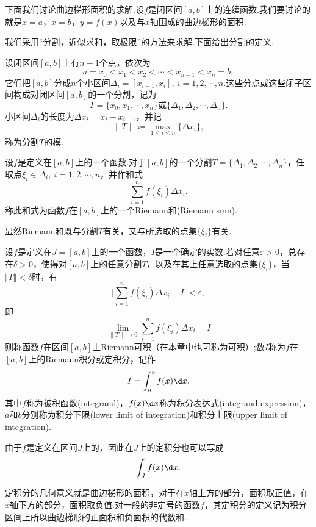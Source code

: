 下面我们讨论曲边梯形面积的求解.设$f$是闭区间$\left[a,b\right]$上的连续函数.我们要讨论的就是$x=a$，$x=b$，$y=f(x)$以及与$x$轴围成的曲边梯形的面积.

我们采用“{\heiti 分割，近似求和，取极限}”的方法来求解.下面给出分割的定义.
\begin{definition}[分割]
	设闭区间$\left[a,b\right]$上有$n-1$个点，依次为
	$$a=x_0<x_1<x_2<\cdots <x_{n-1}<x_n=b,$$
	它们把$\left[a,b\right]$分成$n$个小区间$\Delta_i=\left[x_{i-1},x_i\right],\ i=1,2,\cdots,n$.这些分点或这些闭子区间构成对闭区间$\left[a,b\right]$的一个{\heiti 分割}，记为
	$$T=\{x_0,x_1,\cdots,x_n\}\text{或}\{\Delta_1,\Delta_2,\cdots,\Delta_n\}.$$
	小区间$\Delta_i$的长度为$\Delta x_i=x_i-x_{i-1}$，并记
	$$\| T\|\coloneqq\mathop{\max}_{1\leqslant i\leqslant n}\{\Delta x_i\},$$
	称为分割$T$的{\heiti 模}.
\end{definition}
\begin{definition}[Riemann和]
	设$f$是定义在$\left[a,b\right]$上的一个函数.对于$\left[a,b\right]$的一个分割$T=\{\Delta_1,\Delta_2,\cdots,\Delta_n\}$，任取点$\xi_i\in\Delta_i,\ i=1,2,\cdots,n$，并作和式
	$$\sum_{i=1}^{n}f(\xi_i)\Delta x_i.$$
	称此和式为函数$f$在$\left[a,b\right]$上的一个{\heiti Riemann和}(Riemann sum).
\end{definition}
显然Riemann和既与分割$T$有关，又与所选取的点集$\{\xi_i\}$有关.
\begin{definition}[Riemann积分]
	设$f$是定义在$J=\left[a,b\right]$上的一个函数，$I$是一个确定的实数.若对任意$\varepsilon>0$，总存在$\delta>0$，使得对$\left[a,b\right]$上的{\heiti 任意}分割$T$，以及在其上{\heiti 任意}选取的点集$\{\xi_i\}$，当$\Vert T\Vert<\delta$时，有
	$$\big|\sum_{i=1}^{n}f(\xi_i)\Delta x_i-I\big|<\varepsilon,$$
	即
	$$\lim\limits_{\|T\|\to 0}\sum_{i=1}^{n}f(\xi_i)\Delta x_i=I$$
	则称函数$f$在区间$\left[a,b\right]$上{\heiti Riemann可积}（在本章中也可称为可积）;数$I$称为$f$在$\left[a,b\right]$上的{\heiti Riemann积分}或{\heiti 定积分}，记作
	$$I=\int_{a}^{b}f(x)\d x.$$
	其中$f$称为{\heiti 被积函数}(integrand)，$f(x)\d x$称为{\heiti 积分表达式}(integrand expression)，$a$和$b$分别称为{\heiti 积分下限}(lower limit of integration)和{\heiti 积分上限}(upper limit of integration).
\end{definition}
\begin{remark}
	由于$f$是定义在区间$J$上的，因此在$J$上的定积分也可以写成
	$$\int_{J}f(x)\d x.$$
\end{remark}
\begin{remark}
	定积分的几何意义就是曲边梯形的面积，对于在$x$轴上方的部分，面积取正值，在$x$轴下方的部分，面积取负值.对一般的非定号的函数$f$，其定积分的定义记为积分区间上所以曲边梯形的正面积和负面积的代数和.
\end{remark}
